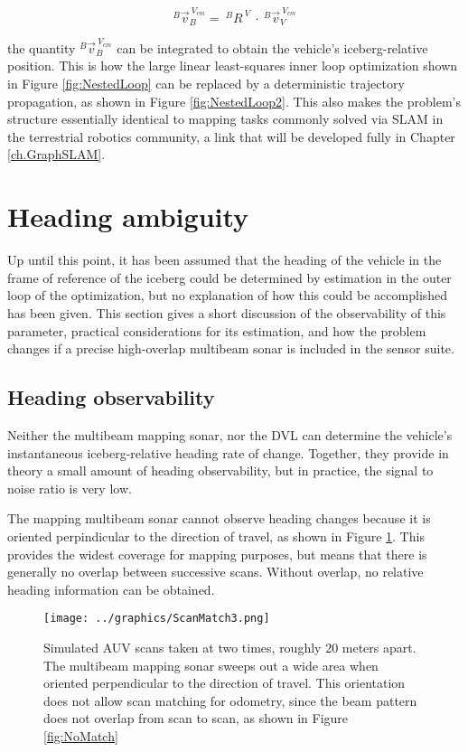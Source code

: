    \begin{equation}
   ^B\vec{v}^{~V_{cm}}_B= ~^BR^{~V}~ \cdot~^B\vec{v}^{~V_{cm}}_V
   \label{eqn:boomLinAlg}
\end{equation}

the quantity $^B\vec{v}^{~V_{cm}}_B$ can be integrated to obtain the vehicle's iceberg-relative position. This is how the large linear least-squares inner loop optimization shown in Figure \ref{fig:NestedLoop} can be replaced by a deterministic trajectory propagation, as shown in Figure \ref{fig:NestedLoop2}. This also makes the problem's structure essentially identical to mapping tasks commonly solved via SLAM in the terrestrial robotics community, a link that will be developed fully in Chapter \ref{ch.GraphSLAM}.

\section{Heading ambiguity}

Up until this point, it has been assumed that the heading of the vehicle in the frame of reference of the iceberg could be determined by estimation in the outer loop of the optimization, but no explanation of how this could be accomplished has been given. This section gives a short discussion of the observability of this parameter, practical considerations for its estimation, and how the problem changes if a precise high-overlap multibeam sonar is included in the sensor suite.

\subsection{Heading observability}

Neither the multibeam mapping sonar, nor the DVL can determine the vehicle's instantaneous iceberg-relative heading rate of change. Together, they provide in theory a small amount of heading observability, but in practice, the signal to noise ratio is very low.

The mapping multibeam sonar cannot observe heading changes because it is oriented perpindicular to the direction of travel, as shown in Figure \ref{fig:beamOrientation}. This provides the widest coverage for mapping purposes, but means that there is generally no overlap between successive scans. Without overlap, no relative heading information can be obtained. 

\begin{figure}[h]
   \centering
   \texttt{[image: ../graphics/ScanMatch3.png]} %
   \caption{Simulated AUV scans taken at two times, roughly 20 meters apart. The multibeam mapping sonar sweeps out a wide area when oriented perpendicular to the direction of travel. This orientation does not allow scan matching for odometry, since the beam pattern does not overlap from scan to scan, as shown in Figure \ref{fig:NoMatch}}
   \label{fig:beamOrientation}
\end{figure}

